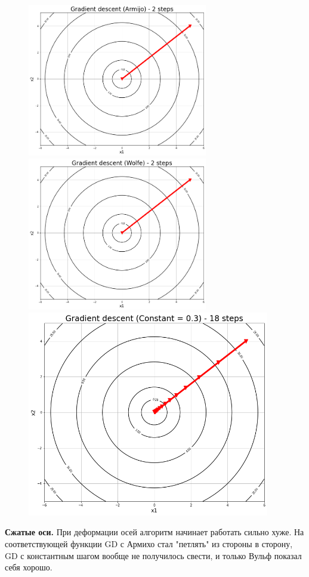 \documentclass[14pt]{article}
\begin{document}
\begin{figure}[h]
\centering
	\includegraphics[height=6.7cm]{sym_armijo.png}
	\includegraphics[height=6.7cm]{sym_wolfe.png}
	\includegraphics[height=9cm]{sym_const.png}
\end{figure}

\newpage


\textbf{Сжатые оси.} При деформации осей алгоритм начинает работать сильно хуже. На соответствующей функции GD с Армихо стал "петлять" из стороны в сторону, GD с константным шагом вообще не получилось свести, и только Вульф показал себя хорошо.
\end{document}
